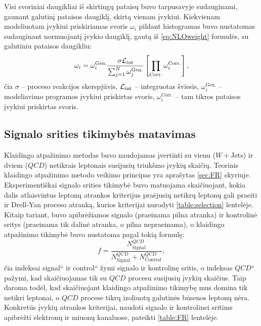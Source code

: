 \documentclass[a4paper, 12pt, oneside]{article}
\newcommand{\WJets}{W\! +\!\mathrm{Jets}}
\newcommand{\ltq}[1]{{\quotedblbase{}#1\textquotedblleft{}}}
\newcommand{\Lumi}{{\cal L}_\mathrm{int}}
\newcommand{\QCD}{QC\! D}
\newlength\q
\begin{document}
Visi svoriniai daugikliai iš skirtingų pataisų buvo tarpusavyje sudauginami, gaunant galutinį pataisos daugiklį, skirtą vienam įvykiui.
Kiekvienam modeliuotam įvykiui priskiriamas svoris $\omega_i$ pildant histogramas buvo nustatomas sudauginant normuojantį įvykio daugiklį,
gautą iš \eqref{eq:NLOweight} formulės, su galutiniu pataisos daugikliu:
\begin{equation}
\label{eq:weightCorr}
	\omega_i = \omega_{i}^{\mathrm{Gen.}} \frac{ \sigma\Lumi }{ \sum_{j=1}^{N}\omega_{j}^{\mathrm{Gen.}} }
			   \left[ \prod_{\mathrm{Corr.}} \omega_i^{\mathrm{Corr.}} \right] ,
\end{equation}
čia $\sigma$ -- proceso reakcijos skerspjūvis, $\Lumi$ -- integruotas šviesis, $\omega_{i}^{\mathrm{Gen.}}$ -- modeliavimo
programos įvykiui priskirtas svoris, $\omega_i^{\mathrm{Corr.}}$ -- tam tikros pataisos įvykiui priskirtas svoris.


\subsection{Signalo srities tikimybės matavimas}\label{sec:FRmeasure}
Klaidingo atpažinimo metodas buvo naudojamas įvertinti su vienu ($\WJets$) ir dviem ($\QCD$) netikrais leptonais
susijusių triukšmo įvykių skaičių.
Teorinis klaidingo atpažinimo metodo veikimo principas yra aprašytas \ref{sec:FR} skyriuje.
Eksperimentiškai signalo srities tikimybė buvo matuojama skaičiuojant, kokia dalis atlaisvintus leptonų atrankos
kriterijus praėjusių netikrų leptonų gali praeiti ir Drell-Yan proceso atranką, kurios kriterijai nurodyti
\ref{table:selection} lentelėje.
Kitaip tariant, buvo apibrėžiamos signalo (praeinama pilna atranka) ir kontrolinė sritys (praeinama tik dalinė
atranka, o pilna nepraeinama), o klaidingo atpažinimo tikimybė buvo nustatoma pagal tokią formulę:
\begin{equation}
	\label{eq:FRexp}
	f = \frac{N_{\mathrm{Signal}}^{\QCD}}{N_{\mathrm{Signal}}^{\QCD}+N_{\mathrm{Control}}^{\QCD}},
\end{equation}
čia indeksai \ltq{signal} ir \ltq{control} žymi signalo ir kontrolinę sritis, o indeksas \ltq{$\QCD$} pažymi, kad
skaičiuojamas tik su $\QCD$ procesu susijusių įvykių skaičius.
Taip daroma todėl, kad skaičiuojant klaidingo atpažinimo tikimybę mus domina tik netikri leptonai,
o $\QCD$ procese tikrų izoliuotų galutinės būsenos leptonų nėra.
Konkretūs įvykių atrankos kriterijai, naudoti signalo ir kontrolinei sritims apibrėžti elektronų ir miuonų kanaluose,
pateikti \ref{table:FR} lentelėje.
\end{document}
